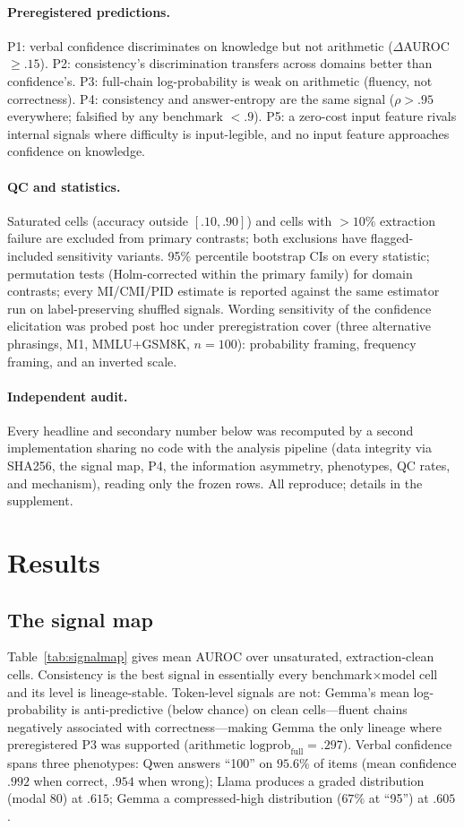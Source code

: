 \documentclass[10pt]{article}
\begin{document}
\paragraph{Preregistered predictions.} P1: verbal confidence discriminates on knowledge but not
arithmetic ($\Delta$AUROC $\ge .15$). P2: consistency's discrimination transfers across domains
better than confidence's. P3: full-chain log-probability is weak on arithmetic (fluency, not
correctness). P4: consistency and answer-entropy are the same signal ($\rho > .95$ everywhere;
falsified by any benchmark $< .9$). P5: a zero-cost input feature rivals internal signals where
difficulty is input-legible, and no input feature approaches confidence on knowledge.

\paragraph{QC and statistics.} Saturated cells (accuracy outside $[.10,.90]$) and cells with
${>}10\%$ extraction failure are excluded from primary contrasts; both exclusions have
flagged-included sensitivity variants. 95\% percentile bootstrap CIs on every statistic;
permutation tests (Holm-corrected within the primary family) for domain contrasts; every
MI/CMI/PID estimate is reported against the same estimator run on label-preserving shuffled
signals. Wording sensitivity of the confidence elicitation was probed post hoc under
preregistration cover (three alternative phrasings, M1, MMLU+GSM8K, $n{=}100$): probability
framing, frequency framing, and an inverted scale.

\paragraph{Independent audit.} Every headline and secondary number below was recomputed by a
second implementation sharing no code with the analysis pipeline (data integrity via SHA256,
the signal map, P4, the information asymmetry, phenotypes, QC rates, and mechanism), reading
only the frozen rows. All reproduce; details in the supplement.

\section{Results}

\subsection{The signal map}
Table~\ref{tab:signalmap} gives mean AUROC over unsaturated, extraction-clean cells.
Consistency is the best signal in essentially every benchmark$\times$model cell and its level
is lineage-stable. Token-level signals are not: Gemma's mean log-probability is anti-predictive
(below chance) on clean cells---fluent chains negatively associated with correctness---making
Gemma the only lineage where preregistered P3 was supported (arithmetic
$\text{logprob}_{\text{full}} = .297$). Verbal confidence spans three phenotypes: Qwen answers
``100'' on $95.6\%$ of items (mean confidence $.992$ when correct, $.954$ when wrong); Llama
produces a graded distribution (modal 80) at $.615$; Gemma a compressed-high distribution
($67\%$ at ``95'') at $.605$.
\end{document}
